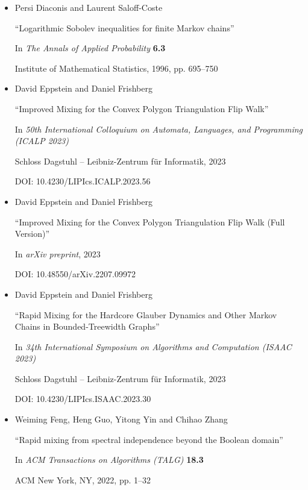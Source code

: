 \begin{itemize}
      

\item[] [DS96]
Persi Diaconis and Laurent Saloff-Coste

“Logarithmic Sobolev inequalities for finite Markov chains”

In \emph{The Annals of Applied Probability} \textbf{6.3}

Institute of Mathematical Statistics, 1996, pp. 695–750


      

\item[] [EF23]
David Eppstein and Daniel Frishberg

“Improved Mixing for the Convex Polygon Triangulation Flip Walk”

In \emph{50th International Colloquium on Automata, Languages, and Programming (ICALP 2023)}

Schloss Dagstuhl – Leibniz-Zentrum für Informatik, 2023

DOI: 10.4230/LIPIcs.ICALP.2023.56


      

\item[] [EF23a]
David Eppstein and Daniel Frishberg

“Improved Mixing for the Convex Polygon Triangulation Flip Walk (Full Version)”

In \emph{arXiv preprint}, 2023

DOI: 10.48550/arXiv.2207.09972


      

\item[] [EF23b]
David Eppstein and Daniel Frishberg

“Rapid Mixing for the Hardcore Glauber Dynamics and Other Markov Chains in Bounded-Treewidth Graphs”

In \emph{34th International Symposium on Algorithms and Computation (ISAAC 2023)}

Schloss Dagstuhl – Leibniz-Zentrum für Informatik, 2023

DOI: 10.4230/LIPIcs.ISAAC.2023.30


      

\item[] [Fen+22]
Weiming Feng, Heng Guo, Yitong Yin and Chihao Zhang

“Rapid mixing from spectral independence beyond the Boolean domain”

In \emph{ACM Transactions on Algorithms (TALG)} \textbf{18.3}

ACM New York, NY, 2022, pp. 1–32



\end{itemize}
